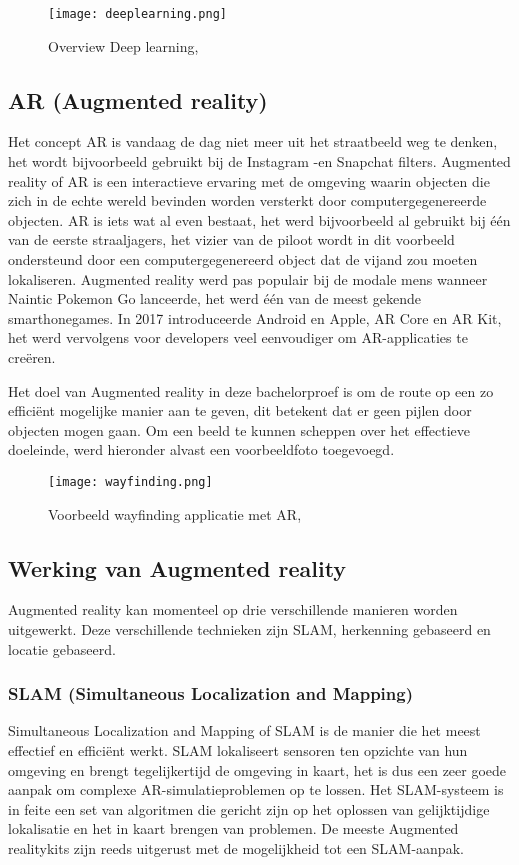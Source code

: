 \begin{figure}[H]
	\centering
	\texttt{[image: deeplearning.png]}
	\caption{Overview Deep learning, \autocite{ObjRec2020}}
\end{figure}

\subsection{AR (Augmented reality)}
Het concept AR is vandaag de dag niet meer uit het straatbeeld weg te denken, het wordt bijvoorbeeld gebruikt bij de Instagram -en Snapchat filters. Augmented reality of AR is een interactieve ervaring met de omgeving waarin objecten die zich in de echte wereld bevinden worden versterkt door computergegenereerde objecten. AR is iets wat al even bestaat, het werd bijvoorbeeld al gebruikt bij één van de eerste straaljagers, het vizier van de piloot wordt in dit voorbeeld ondersteund door een computergegenereerd object dat de vijand zou moeten lokaliseren. Augmented reality werd pas populair bij de modale mens wanneer Naintic Pokemon Go lanceerde, het werd één van de meest gekende smarthonegames. In 2017 introduceerde Android en Apple, AR Core en AR Kit, het werd vervolgens voor developers veel eenvoudiger om AR-applicaties te creëren. \autocite{NewGenApps2017}

Het doel van Augmented reality in deze bachelorproef is om de route op een zo efficiënt mogelijke manier aan te geven, dit betekent dat er geen pijlen door objecten mogen gaan. Om een beeld te kunnen scheppen over het effectieve doeleinde, werd hieronder alvast een voorbeeldfoto toegevoegd.

\begin{figure}[H]
	\centering
	\texttt{[image: wayfinding.png]}
	\caption{Voorbeeld wayfinding applicatie met AR, \autocite{MAXST2019}}
\end{figure}

\subsection{Werking van Augmented reality}
Augmented reality kan momenteel op drie verschillende manieren worden uitgewerkt. Deze verschillende technieken zijn SLAM, herkenning gebaseerd en locatie gebaseerd.

\subsubsection{SLAM (Simultaneous Localization and Mapping)}
Simultaneous Localization and Mapping of SLAM is de manier die het meest effectief en efficiënt werkt. SLAM lokaliseert sensoren ten opzichte van hun omgeving en brengt tegelijkertijd de omgeving in kaart, het is dus een zeer goede aanpak om complexe AR-simulatieproblemen op te lossen. Het SLAM-systeem is in feite een set van algoritmen die gericht zijn op het oplossen van gelijktijdige lokalisatie en het in kaart brengen van problemen. De meeste Augmented realitykits zijn reeds uitgerust met de mogelijkheid tot een SLAM-aanpak. \autocite{NewGenApps2017}


